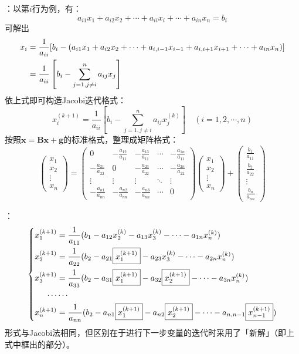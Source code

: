 \entry {}：以第$i$行为例，有：
\[a_{i1}x_1+a_{i2}x_2+\cdots+a_{ii}x_i+\cdots+a_{in}x_n=b_i\]
可解出
\begin{align}
x_i&=\frac1{a_{ii}}[b_i-(a_{i1}x_1+a_{i2}x_2+\cdots+a_{i,i-1}x_{i-1}+a_{i,i+1}x_{i+1}+\cdots+a_{in}x_n)]\notag\\
&=\frac1{a_{ii}}\left[b_i-\sum_{j=1,j\neq i}^na_{ij}x_j\right]
\end{align}
依上式即可构造Jacobi迭代格式：
\begin{equation}
x_i^{(k+1)}=\frac1{a_{ii}}\left[b_i-\sum_{j=1,j\neq i}^na_{ij}x_j^{(k)}\right]\quad(i=1,2,\cdots,n)
\end{equation}
按照$\mathbf{x=Bx+g}$的标准格式，整理成矩阵格式：
\begin{equation}
\begin{pmatrix}x_1\\x_2\\\vdots\\x_n\end{pmatrix}=\begin{pmatrix}0&-\frac{a_{12}}{a_{11}}&-\frac{a_{13}}{a_{11}}&\cdots&-\frac{a_{1n}}{a_{11}}\\-\frac{a_{21}}{a_{22}}&0&-\frac{a_{23}}{a_{22}}&\cdots&-\frac{a_{2n}}{a_{22}}\\\vdots&\vdots&\vdots&\ddots&\vdots\\-\frac{a_{n1}}{a_{nn}}&-\frac{a_{n2}}{a_{nn}}&-\frac{a_{n3}}{a_{nn}}&\cdots&0\end{pmatrix}\begin{pmatrix}x_1\\x_2\\\vdots\\x_n\end{pmatrix}+\begin{pmatrix}\frac{b_1}{a_{11}}\\\frac{b_2}{a_{22}}\\\vdots\\\frac{b_n}{a_{nn}}\end{pmatrix}
\end{equation}

\entry {}：
\begin{equation}
\left\{
\begin{aligned}
x_1^{(k+1)}&=\frac1{a_{11}}(b_1-a_{12}x_2^{(k)}-a_{13}x_3^{(k)}-\cdots-a_{1n}x_n^{(k)})\\
x_2^{(k+1)}&=\frac1{a_{22}}(b_2-a_{21}\fbox{$x_1^{(k+1)}$}-a_{23}x_3^{(k)}-\cdots-a_{2n}x_n^{(k)})\\
x_3^{(k+1)}&=\frac1{a_{33}}(b_2-a_{31}\fbox{$x_1^{(k+1)}$}-a_{32}\fbox{$x_2^{(k+1)}$}-\cdots-a_{3n}x_n^{(k)})\\
\cdots&\cdots\\
x_n^{(k+1)}&=\frac1{a_{nn}}(b_2-a_{n1}\fbox{$x_1^{(k+1)}$}-a_{n2}\fbox{$x_2^{(k+1)}$}-\cdots-a_{n,n-1}\fbox{$x_{n-1}^{(k+1)}$})
\end{aligned}
\right.
\end{equation}
形式与Jacobi法相同，但区别在于进行下一步变量的迭代时采用了「新解」（即上式中框出的部分）。

